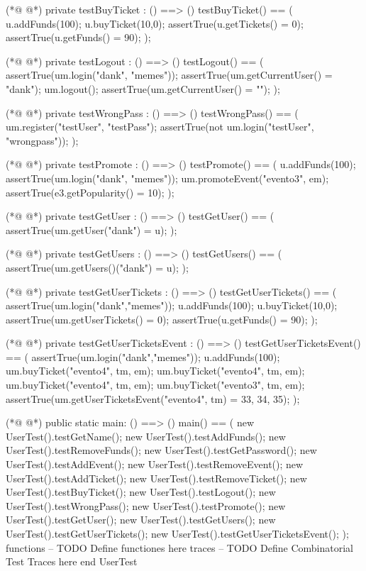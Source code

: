 \begin{vdmpp}[breaklines=true]
(*@
\label{testBuyTicket:76}
@*)
 private testBuyTicket : () ==> ()
 testBuyTicket() == (
  u.addFunds(100);
  u.buyTicket(10,0);
  assertTrue(u.getTickets() = {0});
  assertTrue(u.getFunds() = 90);
 );
 
(*@
\label{testLogout:84}
@*)
 private testLogout : () ==> ()
 testLogout() == (
  assertTrue(um.login("dank", "memes"));
  assertTrue(um.getCurrentUser() = "dank");
  um.logout();
  assertTrue(um.getCurrentUser() = "");
 );
 
(*@
\label{testWrongPass:92}
@*)
 private testWrongPass : () ==> ()
 testWrongPass() == (
  um.register("testUser", "testPass");
  assertTrue(not um.login("testUser", "wrongpass"));
 );
 
(*@
\label{testPromote:98}
@*)
 private testPromote : () ==> ()
 testPromote() == (
  u.addFunds(100);
  assertTrue(um.login("dank", "memes"));
  um.promoteEvent("evento3", em);
  assertTrue(e3.getPopularity() = 10);
 );
 
(*@
\label{testGetUser:106}
@*)
 private testGetUser : () ==> ()
 testGetUser() == (
  assertTrue(um.getUser("dank") = u);
 );
 
(*@
\label{testGetUsers:111}
@*)
 private testGetUsers : () ==> ()
 testGetUsers() == (
  assertTrue(um.getUsers()("dank") = u);
 );
 
(*@
\label{testGetUserTickets:116}
@*)
 private testGetUserTickets : () ==> ()
 testGetUserTickets() == (
  assertTrue(um.login("dank","memes"));
  u.addFunds(100);
  u.buyTicket(10,0);
  assertTrue(um.getUserTickets() = {0});
  assertTrue(u.getFunds() = 90);
 );
 
(*@
\label{testGetUserTicketsEvent:125}
@*)
 private testGetUserTicketsEvent : () ==> ()
 testGetUserTicketsEvent() == (
  assertTrue(um.login("dank","memes"));
  u.addFunds(100);
  um.buyTicket("evento4", tm, em);
  um.buyTicket("evento4", tm, em);
  um.buyTicket("evento4", tm, em);
  um.buyTicket("evento3", tm, em);
  assertTrue(um.getUserTicketsEvent("evento4", tm) = {33, 34, 35});
 );
 
(*@
\label{main:136}
@*)
 public static main: () ==> ()
 main() == (
  new UserTest().testGetName();
  new UserTest().testAddFunds();
  new UserTest().testRemoveFunds();
  new UserTest().testGetPassword();
  new UserTest().testAddEvent();
  new UserTest().testRemoveEvent();
  new UserTest().testAddTicket();
  new UserTest().testRemoveTicket();
  new UserTest().testBuyTicket();
  new UserTest().testLogout();
  new UserTest().testWrongPass();
  new UserTest().testPromote();
  new UserTest().testGetUser();
  new UserTest().testGetUsers();
  new UserTest().testGetUserTickets();
  new UserTest().testGetUserTicketsEvent();
 );
functions
-- TODO Define functiones here
traces
-- TODO Define Combinatorial Test Traces here
end UserTest
\end{vdmpp}
